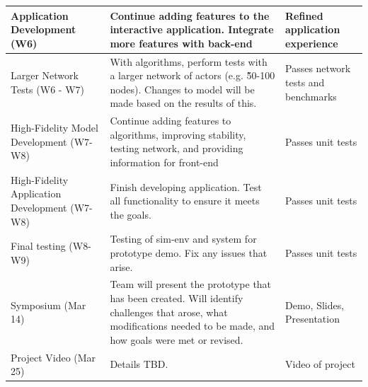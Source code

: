 \documentclass{report}
\begin{document}
\begin{longtable}{|p{4.5cm}|p{6cm}|p{4.5cm}|}
    Application Development (W6)                      & Continue adding features to the interactive application. Integrate more features with back-end                                                                                                                                     & Refined application experience        \\ \hline
    Larger Network Tests (W6 - W7)                    & With algorithms, perform tests with a larger network of actors (e.g. \~50-100 nodes). Changes to model will be made based on the results of this.                                                                                  & Passes network tests and benchmarks   \\ \hline
    High-Fidelity Model Development (W7-W8)           & Continue adding features to algorithms, improving stability, testing network, and providing information for front-end                                                                                                              & Passes unit tests                     \\ \hline
    High-Fidelity Application Development (W7-W8)     & Finish developing application. Test all functionality to ensure it meets the goals.                                                                                                                                                & Passes unit tests                     \\ \hline
    Final testing (W8-W9)                             & Testing of sim-env and system for prototype demo. Fix any issues that arise.                                                                                                                                                       & Passes unit tests                     \\ \hline
    Symposium (Mar 14)                                & Team will present the prototype that has been created. Will identify challenges that arose, what modifications needed to be made, and how goals were met or revised.                                                               & Demo, Slides, Presentation            \\ \hline
    Project Video (Mar 25)                            & Details TBD.                                                                                                                                                                                                                       & Video of project                      \\ \hline

\end{longtable}
\end{document}
